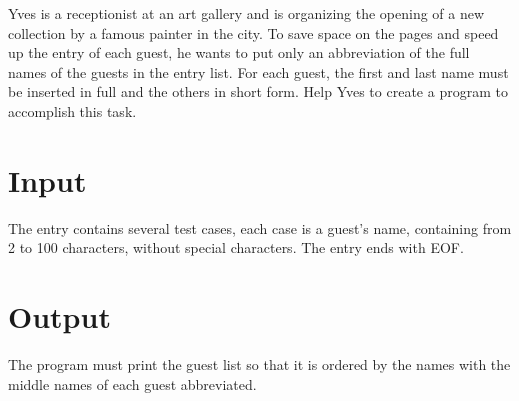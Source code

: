 
Yves is a receptionist at an art gallery and is organizing the opening of a new collection by a famous painter in the city. To save space on the pages and speed up the entry of each guest, he wants to put only an abbreviation of the full names of the guests in the entry list. For each guest, the first and last name must be inserted in full and the others in short form. Help Yves to create a program to accomplish this task.

\section*{Input}
The entry contains several test cases, each case is a guest's name, containing from 2 to 100 characters, without special characters. The entry ends with EOF.

\section*{Output}
The program must print the guest list so that it is ordered by the names with the middle names of each guest abbreviated.
